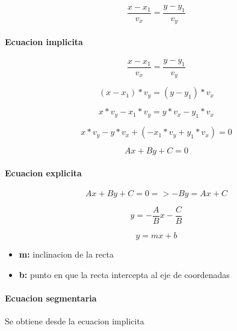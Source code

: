\documentclass[11pt]{article}
\begin{document}
\begin{equation*}
	\frac{x-x_1}{v_x} = \frac{y-y_1}{v_y}
\end{equation*}

\paragraph{Ecuacion implicita}
\begin{equation*}
	\frac{x-x_1}{v_x} = \frac{y-y_1}{v_y}
\end{equation*}

\begin{equation*}
	(x-x_1)*v_y = (y-y_1) * v_x
\end{equation*}

\begin{equation*}
	x*v_y-x_1*v_y = y*v_x-y_1*v_x
\end{equation*}

\begin{equation*}
	x*v_y - y*v_x + (-x_1*v_y +y_1*v_x)= 0
\end{equation*}

\begin{equation*}
	Ax + By + C = 0
\end{equation*}

\paragraph{Ecuacion explicita}

\begin{equation*}
	Ax + By + C = 0 => -By = Ax+C
\end{equation*}

\begin{equation*}
	y = -\frac{A}{B} x- \frac{C}{B}
\end{equation*}

\begin{equation*}
	y = mx + b
\end{equation*}

\begin{itemize}
	\item \textbf{m:} inclinacion de la recta
	\item \textbf{b:} punto en que la recta intercepta al eje de coordenadas
\end{itemize}

\paragraph{Ecuacion segmentaria}
Se obtiene desde la ecuacion implicita
\end{document}
